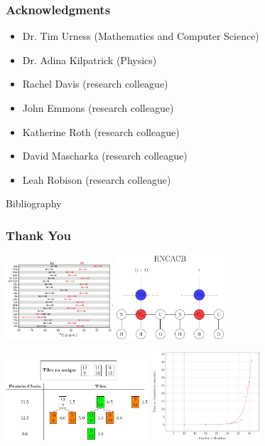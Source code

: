 \documentclass{beamer}
\begin{document}
\begin{frame}
	\frametitle{Acknowledgments}
	\begin{itemize}
		\item Dr. Tim Urness (Mathematics and Computer Science)
		\item Dr. Adina Kilpatrick (Physics)
		\item Rachel Davis (research colleague)
		\item John Emmons (research colleague)
		\item  Katherine Roth (research colleague)
		\item  David Mascharka (research colleague)
		\item  Leah Robison (research colleague)
	\end{itemize}
\end{frame}

\begin{frame}{Bibliography}


\end{frame}

\begin{frame}
	\frametitle{Thank You} 
	\begin{center}
	\includegraphics[width=0.3\textwidth]{carbon}\hspace{2em}
	\includegraphics[width=0.3\textwidth]{diagram}
	\end{center}
	\begin{center}
	\includegraphics[width=0.4\textwidth]{time_line}\hspace{2em}
	\includegraphics[width=0.3\textwidth]{plot}
\end{center}
\end{frame}
\end{document}
